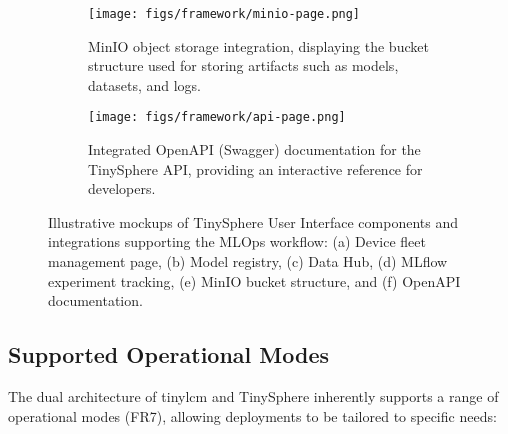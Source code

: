 \begin{figure}[htbp]
    \begin{subfigure}[b]{0.48\textwidth}
        \centering
        \texttt{[image: figs/framework/minio-page.png]} %
        \caption{MinIO object storage integration, displaying the bucket structure used for storing artifacts such as models, datasets, and logs.}
        \label{fig:ui_minio_integration} %
    \end{subfigure}
    \hfill
    \begin{subfigure}[b]{0.48\textwidth}
        \centering
        \texttt{[image: figs/framework/api-page.png]} %
        \caption{Integrated OpenAPI (Swagger) documentation for the TinySphere API, providing an interactive reference for developers.}
        \label{fig:ui_openapi_docs} %
    \end{subfigure}

    \caption{Illustrative mockups of TinySphere User Interface components and integrations supporting the MLOps workflow: (a) Device fleet management page, (b) Model registry, (c) Data Hub, (d) MLflow experiment tracking, (e) MinIO bucket structure, and (f) OpenAPI documentation.}
    \label{fig:tinysphere_ui_examples_3x2} %
\end{figure}

\subsection{Supported Operational Modes}
\label{ssec:ecosystem_operational_modes}

The dual architecture of \gls{tinylcm} and TinySphere inherently supports a range of operational modes (FR7), allowing deployments to be tailored to specific needs:

